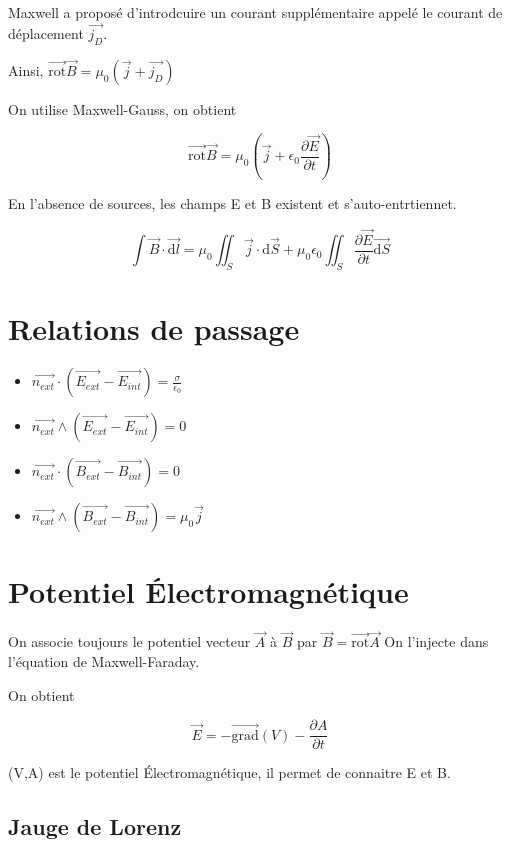 \documentclass[french]{yLectureNote}
\renewcommand{\vec}{\overrightarrow}
\newcommand{\dd}{\mathrm{d}}
\newcommand{\rot}{\vec{\mathrm{rot}}}
\newcommand{\grad}{\vec{\mathrm{grad}}}
\begin{document}
Maxwell a proposé d'introdcuire un courant supplémentaire appelé le courant de déplacement $\vec{j_D}$.

Ainsi, $\rot\vec{B} = \mu_0(\vec{j}+\vec{j_D})$

On utilise Maxwell-Gauss, on obtient
\begin{theorem}
    $$\rot\vec{B} = \mu_0\left(\vec{j}+\epsilon_0\frac{\partial \vec{E}}{\partial t}\right)$$
\end{theorem}

En l'absence de sources, les champs E et B existent et s'auto-entrtiennet.
\begin{theorem}
   $$\int\vec{B}\cdot \vec{\dd l} = \mu_0 \iint_S \vec{j}\cdot \dd \vec{S}+\mu_0\epsilon_0 \iint_S \frac{\partial \vec{E}}{\partial t}\vec{\dd S}$$ 
\end{theorem}
\section{Relations de passage}
\begin{itemize}
    \item $\vec{n_{ext}}\cdot (\vec{E_{ext}}-\vec{E_{int}}) = \frac{\sigma}{\epsilon_0}$
    \item $\vec{n_{ext}}\wedge (\vec{E_{ext}}-\vec{E_{int}}) = 0$
    \item $\vec{n_{ext}}\cdot (\vec{B_{ext}}-\vec{B_{int}}) = 0$
    \item $\vec{n_{ext}}\wedge (\vec{B_{ext}}-\vec{B_{int}}) = \mu_0\vec{j}$
\end{itemize}
\section{Potentiel Électromagnétique}
On associe toujours le potentiel vecteur $\vec{A}$ à $\vec{B}$ par $\vec{B} = \rot\vec{A}$ On 
l'injecte dans l'équation de Maxwell-Faraday.

On obtient 
\begin{theorem}
    $$\vec{E} = -\grad(V)-\frac{\partial A}{\partial t}$$
\end{theorem}
(V,A) est le potentiel Électromagnétique, il permet de connaitre E et B.
\subsection{Jauge de Lorenz}
\end{document}
